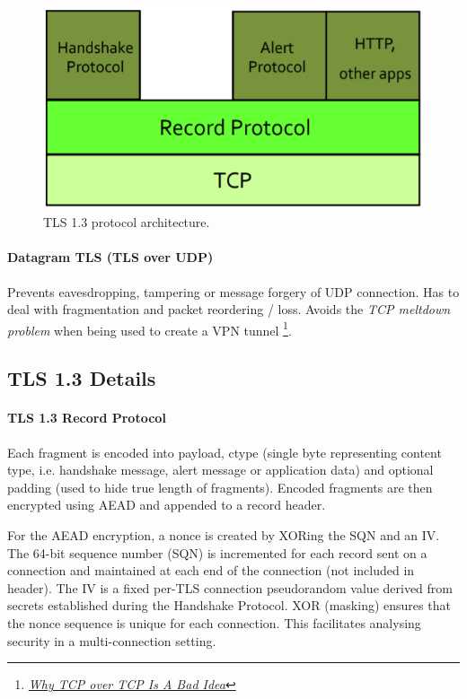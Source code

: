 \begin{figure}[h]
	\centering
	\includegraphics[scale=0.4]{images/3-tls13.PNG}
	\caption{TLS 1.3 protocol architecture.}
	\label{fig:tls13}
\end{figure}

\paragraph{Datagram TLS (TLS over UDP)}
Prevents eavesdropping, tampering or message forgery of UDP connection. Has to deal with fragmentation and packet reordering / loss. Avoids the \textit{TCP meltdown problem} when being used to create a VPN tunnel \footnote{\href{http://sites.inka.de/bigred/devel/tcp-tcp.html}{\textit{Why TCP over TCP Is A Bad Idea}}}.

\subsection{TLS 1.3 Details}

\paragraph{TLS 1.3 Record Protocol}
Each fragment is encoded into payload, ctype (single byte representing content type, i.e. handshake message, alert message or application data) and optional padding (used to hide true length of fragments). Encoded fragments are then encrypted using AEAD and appended to a record header.

For the AEAD encryption, a nonce is created by XORing the SQN and an IV. The 64-bit sequence number (SQN) is incremented for each record sent on a connection and maintained at each end of the connection (not included in header). The IV is a fixed per-TLS connection pseudorandom value derived from secrets established during the Handshake Protocol. XOR (masking) ensures that the nonce sequence is unique for each connection. This facilitates analysing security in a multi-connection setting.


